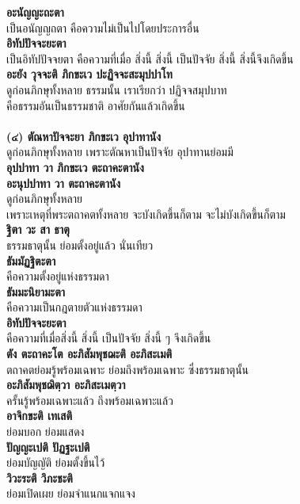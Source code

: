 \documentclass[12pt]{article}
\begin{document}
\textbf{อะนัญญะถะตา}\\
\indent เป็นอนัญญถตา คือความไม่เป็นไปโดยประการอื่น\\
\textbf{อิทัปปัจจะยะตา}\\
\indent เป็นอิทัปปัจจยตา คือความที่เมื่อ สิ่งนี้ สิ่งนี้ เป็นปัจจัย สิ่งนี้ สิ่งนี้จึงเกิดขึ้น\\
\textbf{อะยัง วุจจะติ ภิกขะเว ปะฏิจจะสะมุปปาโท}\\
\indent ดูก่อนภิกษุทั้งหลาย ธรรมนั้น เราเรียกว่า ปฏิจจสมุปบาท \\
\indent คือธรรมอันเป็นธรรมชาติ อาศัยกันแล้วเกิดขึ้น\\
\\
\textbf{(๔) ตัณหาปัจจะยา ภิกขะเว อุปาทานัง}\\
\indent ดูก่อนภิกษุทั้งหลาย เพราะตัณหาเป็นปัจจัย อุปาทานย่อมมี\\
\textbf{อุปปาทา วา ภิกขะเว ตะถาคะตานัง\\
อะนุปปาทา วา ตะถาคะตานัง}\\
\indent ดูก่อนภิกษุทั้งหลาย\\
\indent เพราะเหตุที่พระตถาคตทั้งหลาย จะบังเกิดขึ้นก็ตาม จะไม่บังเกิดขึ้นก็ตาม\\
\textbf{ฐิตา วะ สา ธาตุ}\\
\indent ธรรมธาตุนั้น ย่อมตั้งอยู่แล้ว นั่นเทียว\\
\textbf{ธัมมัฏฐิตะตา}\\
\indent คือความตั้งอยู่แห่งธรรมดา\\
\textbf{ธัมมะนิยามะตา}\\
\indent คือความเป็นกฎตายตัวแห่งธรรมดา\\
\textbf{อิทัปปัจจะยะตา}\\
\indent คือความที่เมื่อสิ่งนี้ สิ่งนี้ เป็นปัจจัย สิ่งนี้ ๆ จึงเกิดขึ้น\\
\textbf{ตัง ตะถาคะโต อะภิสัมพุชฌะติ อะภิสะเมติ}\\
\indent ตถาคตย่อมรู้พร้อมเฉพาะ ย่อมถึงพร้อมเฉพาะ ซึ่งธรรมธาตุนั้น\\
\textbf{อะภิสัมพุชฌิตฺวา อะภิสะเมตฺวา}\\
\indent ครั้นรู้พร้อมเฉพาะแล้ว ถึงพร้อมเฉพาะแล้ว\\
\textbf{อาจิกขะติ เทเสติ}\\
\indent ย่อมบอก ย่อมแสดง\\
\textbf{ปัญญะเปติ ปัฏฐะเปติ}\\
\indent ย่อมบัญญัติ ย่อมตั้งขึ้นไว้\\
\textbf{วิวะระติ วิภะชะติ}\\
\indent ย่อมเปิดเผย ย่อมจำแนกแจกแจง\\
\end{document}
